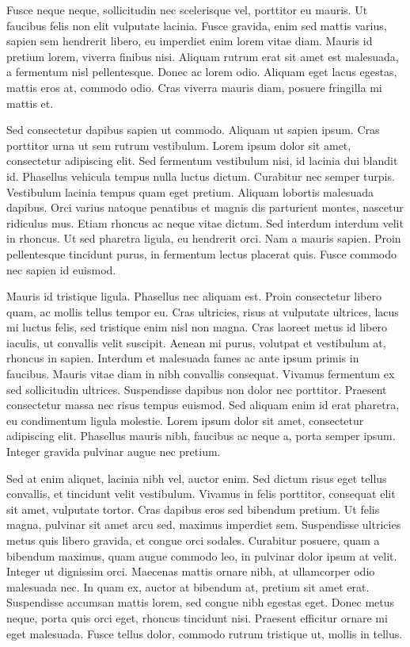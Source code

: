 Fusce neque neque, sollicitudin nec scelerisque vel, porttitor eu mauris. Ut faucibus felis non elit vulputate lacinia. Fusce gravida, enim sed mattis varius, sapien sem hendrerit libero, eu imperdiet enim lorem vitae diam. Mauris id pretium lorem, viverra finibus nisi. Aliquam rutrum erat sit amet est malesuada, a fermentum nisl pellentesque. Donec ac lorem odio. Aliquam eget lacus egestas, mattis eros at, commodo odio. Cras viverra mauris diam, posuere fringilla mi mattis et.

Sed consectetur dapibus sapien ut commodo. Aliquam ut sapien ipsum. Cras porttitor urna ut sem rutrum vestibulum. Lorem ipsum dolor sit amet, consectetur adipiscing elit. Sed fermentum vestibulum nisi, id lacinia dui blandit id. Phasellus vehicula tempus nulla luctus dictum. Curabitur nec semper turpis. Vestibulum lacinia tempus quam eget pretium. Aliquam lobortis malesuada dapibus. Orci varius natoque penatibus et magnis dis parturient montes, nascetur ridiculus mus. Etiam rhoncus ac neque vitae dictum. Sed interdum interdum velit in rhoncus. Ut sed pharetra ligula, eu hendrerit orci. Nam a mauris sapien. Proin pellentesque tincidunt purus, in fermentum lectus placerat quis. Fusce commodo nec sapien id euismod.

Mauris id tristique ligula. Phasellus nec aliquam est. Proin consectetur libero quam, ac mollis tellus tempor eu. Cras ultricies, risus at vulputate ultrices, lacus mi luctus felis, sed tristique enim nisl non magna. Cras laoreet metus id libero iaculis, ut convallis velit suscipit. Aenean mi purus, volutpat et vestibulum at, rhoncus in sapien. Interdum et malesuada fames ac ante ipsum primis in faucibus. Mauris vitae diam in nibh convallis consequat. Vivamus fermentum ex sed sollicitudin ultrices. Suspendisse dapibus non dolor nec porttitor. Praesent consectetur massa nec risus tempus euismod. Sed aliquam enim id erat pharetra, eu condimentum ligula molestie. Lorem ipsum dolor sit amet, consectetur adipiscing elit. Phasellus mauris nibh, faucibus ac neque a, porta semper ipsum. Integer gravida pulvinar augue nec pretium.

Sed at enim aliquet, lacinia nibh vel, auctor enim. Sed dictum risus eget tellus convallis, et tincidunt velit vestibulum. Vivamus in felis porttitor, consequat elit sit amet, vulputate tortor. Cras dapibus eros sed bibendum pretium. Ut felis magna, pulvinar sit amet arcu sed, maximus imperdiet sem. Suspendisse ultricies metus quis libero gravida, et congue orci sodales. Curabitur posuere, quam a bibendum maximus, quam augue commodo leo, in pulvinar dolor ipsum at velit. Integer ut dignissim orci. Maecenas mattis ornare nibh, at ullamcorper odio malesuada nec. In quam ex, auctor at bibendum at, pretium sit amet erat. Suspendisse accumsan mattis lorem, sed congue nibh egestas eget. Donec metus neque, porta quis orci eget, rhoncus tincidunt nisi. Praesent efficitur ornare mi eget malesuada. Fusce tellus dolor, commodo rutrum tristique ut, mollis in tellus.

